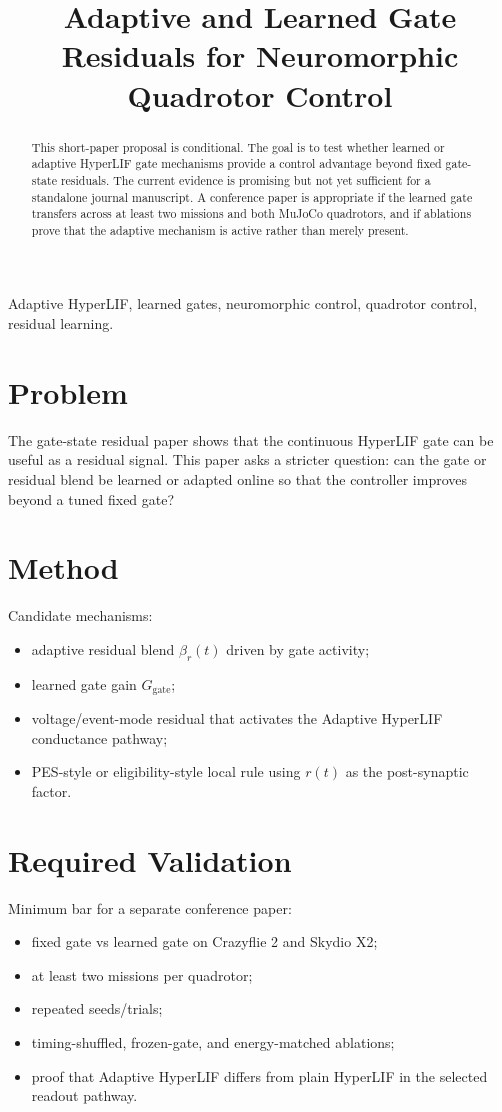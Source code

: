 \documentclass[conference]{IEEEtran}
\title{Adaptive and Learned Gate Residuals for Neuromorphic Quadrotor Control}
\author{\IEEEauthorblockN{Gandhi Alexis Sinhue Contreras Torres, Steven Sandoval, and Luis Rodolfo Garcia Carrillo}
\IEEEauthorblockA{New Mexico State University}}
\begin{document}
\maketitle

\begin{abstract}
This short-paper proposal is conditional. The goal is to test whether learned or adaptive HyperLIF gate mechanisms provide a control advantage beyond fixed gate-state residuals. The current evidence is promising but not yet sufficient for a standalone journal manuscript. A conference paper is appropriate if the learned gate transfers across at least two missions and both MuJoCo quadrotors, and if ablations prove that the adaptive mechanism is active rather than merely present.
\end{abstract}

\begin{IEEEkeywords}
Adaptive HyperLIF, learned gates, neuromorphic control, quadrotor control, residual learning.
\end{IEEEkeywords}

\section{Problem}
The gate-state residual paper shows that the continuous HyperLIF gate can be useful as a residual signal. This paper asks a stricter question: can the gate or residual blend be learned or adapted online so that the controller improves beyond a tuned fixed gate?

\section{Method}
Candidate mechanisms:
\begin{itemize}
  \item adaptive residual blend $\beta_r(t)$ driven by gate activity;
  \item learned gate gain $G_{\mathrm{gate}}$;
  \item voltage/event-mode residual that activates the Adaptive HyperLIF conductance pathway;
  \item PES-style or eligibility-style local rule using $r(t)$ as the post-synaptic factor.
\end{itemize}

\section{Required Validation}
Minimum bar for a separate conference paper:
\begin{itemize}
  \item fixed gate vs learned gate on Crazyflie 2 and Skydio X2;
  \item at least two missions per quadrotor;
  \item repeated seeds/trials;
  \item timing-shuffled, frozen-gate, and energy-matched ablations;
  \item proof that Adaptive HyperLIF differs from plain HyperLIF in the selected readout pathway.
\end{itemize}
\end{document}
